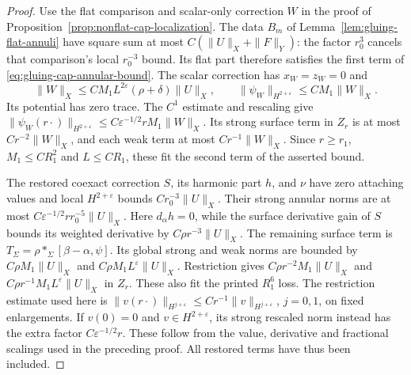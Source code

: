 \documentclass[11pt]{amsart}
\theoremstyle{definition}
\theoremstyle{remark}
\theoremstyle{plain}
\begin{document}
\begin{proof}
Use the flat comparison and scalar-only correction $W$ in the proof
of Proposition~\ref{prop:nonflat-cap-localization}. The data $B_m$
of Lemma~\ref{lem:gluing-flat-annuli} have square sum at most
$C(\|U\|_X+\|F\|_Y)$: the factor $r_0^3$ cancels that
comparison's local $r_0^{-3}$ bound. Its flat part therefore
satisfies the first term of \eqref{eq:gluing-cap-annular-bound}.
The scalar correction has $x_W=z_W=0$ and
\[
 \|W\|_X\leq CM_1L^{2\varepsilon}(\rho+\delta)\|U\|_X,
 \qquad \|\psi_W\|_{H^{2+\varepsilon}}\leq CM_1\|W\|_X.
\]
Its potential has zero trace. The $C^1$ estimate and rescaling give
$\|\psi_W(r\cdot)\|_{H^{2+\varepsilon}}
 \leq C\varepsilon^{-1/2}rM_1\|W\|_X$.
Its strong surface term in $Z_r$ is at most $Cr^{-2}\|W\|_X$,
and each weak term at most $Cr^{-1}\|W\|_X$.
Since $r\geq r_1$, $M_1\leq CR_1^2$ and $L\leq CR_1$,
these fit the second term of the asserted bound.

The restored coexact correction $S$, its harmonic part $h$, and
$\nu$ have zero attaching values and local $H^{2+\varepsilon}$
bounds $Cr_0^{-3}\|U\|_X$. Their strong annular norms are at
most $C\varepsilon^{-1/2}rr_0^{-5}\|U\|_X$.
Here $d_\alpha h=0$, while the surface derivative gain of $S$
bounds its weighted derivative by $C\rho r^{-3}\|U\|_X$.
The remaining surface term is
$T_\Sigma=\rho *_\Sigma[\beta-\alpha,\psi]$. Its global
strong and weak norms are bounded by $C\rho M_1\|U\|_X$
and $C\rho M_1L^\varepsilon\|U\|_X$. Restriction gives
$C\rho r^{-2}M_1\|U\|_X$ and
$C\rho r^{-1}M_1L^\varepsilon\|U\|_X$ in $Z_r$.
These also fit the printed $R_1^6$ loss. The restriction estimate
used here is $\|v(r\cdot)\|_{H^{j+\varepsilon}}
\leq Cr^{-1}\|v\|_{H^{j+\varepsilon}}$, $j=0,1$, on fixed
enlargements. If $v(0)=0$ and $v\in H^{2+\varepsilon}$, its
strong rescaled norm instead has the extra factor
$C\varepsilon^{-1/2}r$. These follow from the value, derivative
and fractional scalings used in the preceding proof. All restored
terms have thus been included.
\end{proof}
\end{document}
